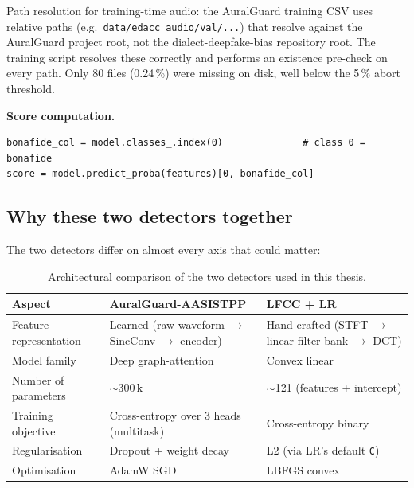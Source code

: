 Path resolution for training-time audio: the AuralGuard training CSV
uses relative paths (e.g.\ \texttt{data/edacc\_audio/val/...}) that
resolve against the AuralGuard project root, not the
dialect-deepfake-bias repository root. The training script resolves
these correctly and performs an existence pre-check on every path.
Only 80 files (0.24\,\%) were missing on disk, well below the 5\,\%
abort threshold.

\textbf{Score computation.}

\begin{verbatim}
bonafide_col = model.classes_.index(0)              # class 0 = bonafide
score = model.predict_proba(features)[0, bonafide_col]
\end{verbatim}

\subsection{Why these two detectors together}
\label{sec:methodology-detectors-both}

The two detectors differ on almost every axis that could matter:

\begin{table}[t]
\centering
\caption{Architectural comparison of the two detectors used in this thesis.}
\label{tab:methodology-detector-comparison}
\begin{tabularx}{\linewidth}{l X X}
\toprule
\textbf{Aspect} & \textbf{AuralGuard-AASISTPP} & \textbf{LFCC + LR} \\
\midrule
Feature representation & Learned (raw waveform $\rightarrow$ SincConv $\rightarrow$ encoder) & Hand-crafted (STFT $\rightarrow$ linear filter bank $\rightarrow$ DCT) \\
Model family           & Deep graph-attention                                              & Convex linear \\
Number of parameters   & $\sim$300\,k                                                      & $\sim$121 (features + intercept) \\
Training objective     & Cross-entropy over 3 heads (multitask)                            & Cross-entropy binary \\
Regularisation         & Dropout + weight decay                                            & L2 (via LR's default \texttt{C}) \\
Optimisation           & AdamW SGD                                                         & LBFGS convex \\
\bottomrule
\end{tabularx}
\end{table}

